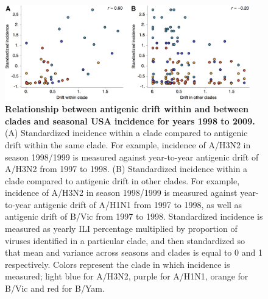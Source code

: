 \documentclass[11pt,oneside,letterpaper]{article}
\begin{document}
\begin{figure}[H]
	\centering		
	\includegraphics[width=0.95\textwidth]{figures/incidence}
	\caption{\textbf{Relationship between antigenic drift within and between clades and seasonal USA incidence for years 1998 to 2009.} 
	(A) Standardized incidence within a clade compared to antigenic drift within the same clade.
	For example, incidence of A/H3N2 in season 1998/1999 is measured against year-to-year antigenic drift of A/H3N2 from 1997 to 1998.
	(B) Standardized incidence within a clade compared to antigenic drift in other clades.
	For example, incidence of A/H3N2 in season 1998/1999 is measured against year-to-year antigenic drift of A/H1N1 from 1997 to 1998, as well as antigenic drift of B/Vic from 1997 to 1998.
	Standardized incidence is measured as yearly ILI percentage multiplied by proportion of viruses identified in a particular clade, and then standardized so that mean and variance across seasons and clades is equal to 0 and 1 respectively.
	Colors represent the clade in which incidence is measured; light blue for A/H3N2, purple for A/H1N1, orange for B/Vic and red for B/Yam.
	} 
	\label{incidence} 
\end{figure}
\end{document}
